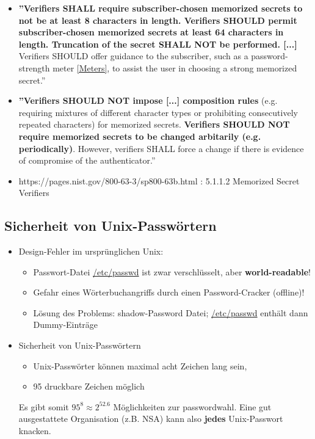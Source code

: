 \documentclass[openany]{book}
\begin{document}
\begin{itemize}
    \item \textbf{''Verifiers SHALL require subscriber-chosen memorized secrets to not be at least 8 characters in length. Verifiers SHOULD permit subscriber-chosen memorized secrets at least 64 characters in length. Truncation of the secret SHALL NOT be performed. [...]} Verifiers SHOULD offer guidance to the subscriber, such as a password-strength meter \underline{[Meters]}, to assist the user in choosing a strong memorized secret.''
    \item \textbf{''Verifiers SHOULD NOT impose [...] composition rules} (e.g. requiring mixtures of different character types or prohibiting consecutively repeated characters) for memorized secrets. \textbf{Verifiers SHOULD NOT require memorized secrets to be changed arbitarily (e.g. periodically)}. However, verifiers SHALL force a change if there is evidence of compromise of the authenticator.''
    \item https://pages.nist.gov/800-63-3/sp800-63b.html : 5.1.1.2 Memorized Secret Verifiers
\end{itemize}

\subsection{Sicherheit von Unix-Passwörtern}

\begin{itemize}
    \item Design-Fehler im ursprünglichen Unix:
    \begin{itemize}
        \item Passwort-Datei \underline{/etc/passwd} ist zwar verschlüsselt, aber \textbf{world-readable}!
        \item Gefahr eines Wörterbuchangriffs durch einen Password-Cracker (offline)!
        \item Lösung des Problems: shadow-Password Datei; \underline{/etc/passwd} enthält dann Dummy-Einträge 
    \end{itemize}
    \item Sicherheit von Unix-Passwörtern
    \begin{itemize}
        \item Unix-Passwörter können maximal acht Zeichen lang sein,
        \item 95 druckbare Zeichen möglich
    \end{itemize}
    Es gibt somit $95^8\approx 2^{52.6}$ Möglichkeiten zur passwordwahl. Eine gut ausgestattete Organisation (z.B. NSA) kann also \textbf{jedes} Unix-Passwort knacken.
\end{itemize}
\end{document}
